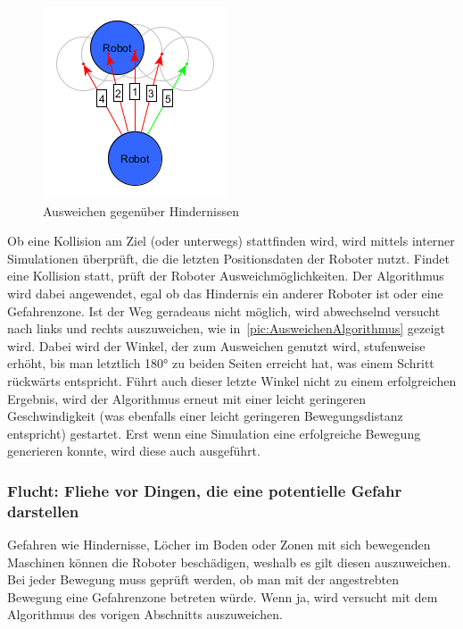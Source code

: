 \begin{figure}
	\includegraphics[width=\pictureWidth,keepaspectratio]{graphics/AusweichenAlgorithmus.png}
	\caption{Ausweichen gegenüber Hindernissen}
	\label{pic:AusweichenAlgorithmus}
\end{figure}

Ob eine Kollision am Ziel (oder unterwegs) stattfinden wird, wird mittels interner Simulationen überprüft, die die letzten Positionsdaten der Roboter nutzt.
Findet eine Kollision statt, prüft der Roboter Ausweichmöglichkeiten. Der Algorithmus wird dabei angewendet, egal ob das Hindernis ein anderer Roboter ist oder eine Gefahrenzone. Ist der Weg geradeaus nicht möglich, wird abwechselnd versucht nach links und rechts auszuweichen, wie in~\autoref{pic:AusweichenAlgorithmus} gezeigt wird. Dabei wird der Winkel, der zum Ausweichen genutzt wird, stufenweise erhöht, bis man letztlich 180° zu beiden Seiten erreicht hat, was einem Schritt rückwärts entspricht. Führt auch dieser letzte Winkel nicht zu einem erfolgreichen Ergebnis, wird der Algorithmus erneut mit einer leicht geringeren Geschwindigkeit (was ebenfalls einer leicht geringeren Bewegungsdistanz entspricht) gestartet. Erst wenn eine Simulation eine erfolgreiche Bewegung generieren konnte, wird diese auch ausgeführt.

\subsubsection*{Flucht: Fliehe vor Dingen, die eine potentielle Gefahr darstellen}

Gefahren wie Hindernisse, Löcher im Boden oder Zonen mit sich bewegenden Maschinen können die Roboter beschädigen, weshalb es gilt diesen auszuweichen. Bei jeder Bewegung muss geprüft werden, ob man mit der angestrebten Bewegung eine Gefahrenzone betreten würde. Wenn ja, wird versucht mit dem Algorithmus des vorigen Abschnitts auszuweichen.

